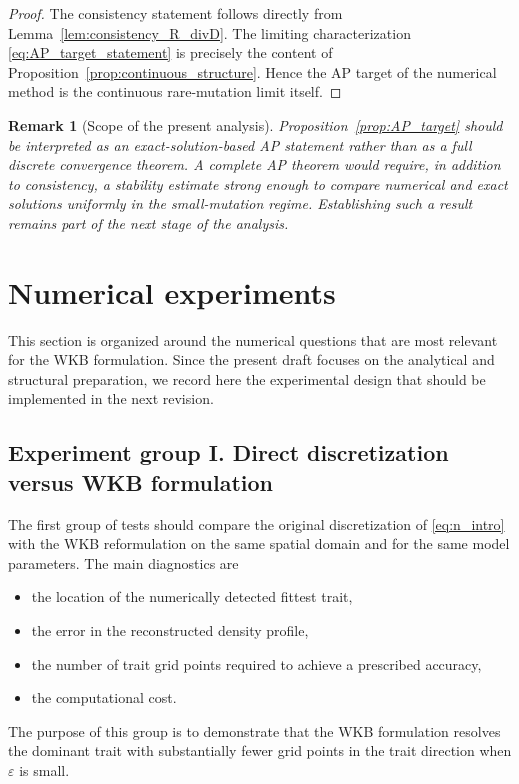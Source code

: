 \documentclass[11pt, dina4, amsfont12]{article}
\newtheorem{remark}{Remark}[section]
\begin{document}
\begin{proof}
The consistency statement follows directly from Lemma~\ref{lem:consistency_R_divD}. The limiting characterization \eqref{eq:AP_target_statement} is precisely the content of Proposition~\ref{prop:continuous_structure}. Hence the AP target of the numerical method is the continuous rare-mutation limit itself.
\end{proof}

\begin{remark}[Scope of the present analysis]\label{rem:AP_scope}
Proposition~\ref{prop:AP_target} should be interpreted as an exact-solution-based AP statement rather than as a full discrete convergence theorem. A complete AP theorem would require, in addition to consistency, a stability estimate strong enough to compare numerical and exact solutions uniformly in the small-mutation regime. Establishing such a result remains part of the next stage of the analysis.
\end{remark}



\section{Numerical experiments}

This section is organized around the numerical questions that are most relevant for the WKB formulation. Since the present draft focuses on the analytical and structural preparation, we record here the experimental design that should be implemented in the next revision.

\subsection{Experiment group I. Direct discretization versus WKB formulation}

The first group of tests should compare the original discretization of \eqref{eq:n_intro} with the WKB reformulation on the same spatial domain and for the same model parameters. The main diagnostics are
\begin{itemize}
\item the location of the numerically detected fittest trait,
\item the error in the reconstructed density profile,
\item the number of trait grid points required to achieve a prescribed accuracy,
\item the computational cost.
\end{itemize}
The purpose of this group is to demonstrate that the WKB formulation resolves the dominant trait with substantially fewer grid points in the trait direction when $\varepsilon$ is small.
\end{document}
